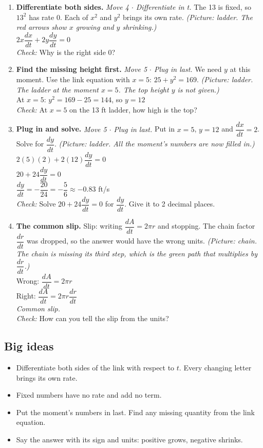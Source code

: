 \documentclass[11pt]{article}
\begin{document}
\begin{enumerate}
\item \textbf{Differentiate both sides.} \textit{Move 4 $\cdot$ Differentiate in t.} The 13 is fixed, so $13^2$ has rate 0. Each of $x^2$ and $y^2$ brings its own rate. \textit{(Picture: ladder. The red arrows show $x$ growing and $y$ shrinking.)}\\ $2x\dfrac{dx}{dt}+2y\dfrac{dy}{dt}=0$\\ \textit{Check:} Why is the right side $0$? 
\item \textbf{Find the missing height first.} \textit{Move 5 $\cdot$ Plug in last.} We need $y$ at this moment. Use the link equation with $x=5$: $25+y^2=169$. \textit{(Picture: ladder. The ladder at the moment $x=5$. The top height $y$ is not given.)}\\ At $x=5$: $y^2=169-25=144$, so $y=12$\\ \textit{Check:} At $x=5$ on the 13 ft ladder, how high is the top? 
\item \textbf{Plug in and solve.} \textit{Move 5 $\cdot$ Plug in last.} Put in $x=5$, $y=12$ and $\dfrac{dx}{dt}=2$. Solve for $\dfrac{dy}{dt}$. \textit{(Picture: ladder. All the moment's numbers are now filled in.)}\\ $2(5)(2)+2(12)\dfrac{dy}{dt}=0$\\ $20+24\dfrac{dy}{dt}=0$\\ $\dfrac{dy}{dt}=-\dfrac{20}{24}=-\dfrac56\approx-0.83$ ft/s\\ \textit{Check:} Solve $20+24\dfrac{dy}{dt}=0$ for $\dfrac{dy}{dt}$. Give it to 2 decimal places. 
\item \textbf{The common slip.} Slip: writing $\dfrac{dA}{dt}=2\pi r$ and stopping. The chain factor $\dfrac{dr}{dt}$ was dropped, so the answer would have the wrong units. \textit{(Picture: chain. The chain is missing its third step, which is the green path that multiplies by $\dfrac{dr}{dt}$.)}\\ Wrong: $\dfrac{dA}{dt}=2\pi r$\\ Right: $\dfrac{dA}{dt}=2\pi r\dfrac{dr}{dt}$\\ \textit{Common slip.}\\ \textit{Check:} How can you tell the slip from the units? 
\end{enumerate}
\subsection*{Big ideas}\begin{itemize}\item Differentiate both sides of the link with respect to $t$. Every changing letter brings its own rate.
\item Fixed numbers have no rate and add no term.
\item Put the moment's numbers in last. Find any missing quantity from the link equation.
\item Say the answer with its sign and units: positive grows, negative shrinks.\end{itemize}
\end{document}

